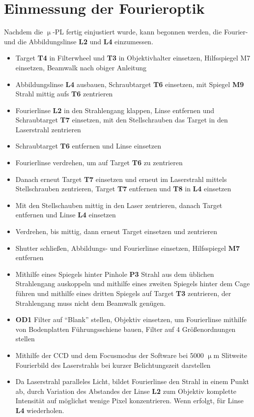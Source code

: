 \section{Einmessung der Fourieroptik}
\label{fourier}
Nachdem die $\upmu$-PL fertig einjustiert wurde, kann begonnen werden, die Fourier- und die Abbildungslinse \textbf{L2} und \textbf{L4} einzumessen.
\begin{itemize}
\item Target \textbf{T4} in Filterwheel und \textbf{T3} in Objektivhalter einsetzen, Hilfsspiegel M7 einsetzen, Beamwalk nach obiger Anleitung
\item Abbildungslinse \textbf{L4} ausbauen, Schraubtarget \textbf{T6} einsetzen, mit Spiegel \textbf{M9} Strahl mittig aufs \textbf{T6} zentrieren
\item Fourierlinse \textbf{L2} in den Strahlengang klappen, Linse entfernen und Schraubtarget \textbf{T7} einsetzen, mit den Stellschrauben  das Target in den Laserstrahl zentrieren
\item Schraubtarget \textbf{T6} entfernen und Linse einsetzen 
\item Fourierlinse verdrehen, um auf Target \textbf{T6} zu zentrieren
\item Danach erneut Target \textbf{T7} einsetzen und erneut im Laserstrahl mittels Stellschrauben zentrieren, Target \textbf{T7} entfernen und \textbf{T8} in \textbf{L4} einsetzen
\item Mit den Stellschauben mittig in den Laser zentrieren, danach Target entfernen und Linse \textbf{L4} einsetzen
\item Verdrehen, bis mittig, dann erneut Target einsetzen und zentrieren
\item Shutter schließen, Abbildungs- und Fourierlinse einsetzen, Hilfsspiegel \textbf{M7} entfernen
\item  Mithilfe eines Spiegels hinter Pinhole \textbf{P3} Strahl aus dem üblichen Strahlengang auskoppeln und mithilfe eines zweiten Spiegels hinter dem Cage führen und mithilfe eines dritten Spiegels auf Target \textbf{T3} zentrieren, der Strahlengang muss nicht dem Beamwalk genügen.
\item \textbf{OD1} Filter auf ``Blank'' stellen, Objektiv einsetzen, um Fourierlinse mithilfe von Bodenplatten Führungsschiene bauen, Filter auf 4 Größenordnungen stellen
\item Mithilfe der CCD und dem Focusmodus der Software bei 5000 $\upmu$m Slitweite Fourierbild des Laserstrahls bei kurzer Belichtungszeit darstellen
\item Da Laserstrahl paralleles Licht, bildet Fourierlinse den Strahl in einem Punkt ab, durch Variation des Abstandes der Linse \textbf{L2} zum Objektiv komplette Intensität auf möglichst wenige Pixel konzentrieren. Wenn erfolgt, für Linse \textbf{L4} wiederholen.
\end{itemize}
\newpage
